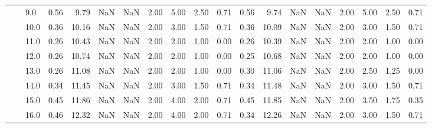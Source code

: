 \begin{tabular}{lllrrrrrrrrrrrrrrrr}
       &     & 9.0  &      0.56 &       9.79 &               NaN &                NaN & 2.00 &   5.00 &             2.50 &                         0.71 &      0.56 &       9.74 &               NaN &                NaN & 2.00 &   5.00 &             2.50 &                         0.71 \\
       &     & 10.0 &      0.36 &      10.16 &               NaN &                NaN & 2.00 &   3.00 &             1.50 &                         0.71 &      0.36 &      10.09 &               NaN &                NaN & 2.00 &   3.00 &             1.50 &                         0.71 \\
       &     & 11.0 &      0.26 &      10.43 &               NaN &                NaN & 2.00 &   2.00 &             1.00 &                         0.00 &      0.26 &      10.39 &               NaN &                NaN & 2.00 &   2.00 &             1.00 &                         0.00 \\
       &     & 12.0 &      0.26 &      10.74 &               NaN &                NaN & 2.00 &   2.00 &             1.00 &                         0.00 &      0.25 &      10.68 &               NaN &                NaN & 2.00 &   2.00 &             1.00 &                         0.00 \\
       &     & 13.0 &      0.26 &      11.08 &               NaN &                NaN & 2.00 &   2.00 &             1.00 &                         0.00 &      0.30 &      11.06 &               NaN &                NaN & 2.00 &   2.50 &             1.25 &                         0.00 \\
       &     & 14.0 &      0.34 &      11.45 &               NaN &                NaN & 2.00 &   3.00 &             1.50 &                         0.71 &      0.34 &      11.48 &               NaN &                NaN & 2.00 &   3.00 &             1.50 &                         0.71 \\
       &     & 15.0 &      0.45 &      11.86 &               NaN &                NaN & 2.00 &   4.00 &             2.00 &                         0.71 &      0.45 &      11.85 &               NaN &                NaN & 2.00 &   3.50 &             1.75 &                         0.35 \\
       &     & 16.0 &      0.46 &      12.32 &               NaN &                NaN & 2.00 &   4.00 &             2.00 &                         0.71 &      0.34 &      12.26 &               NaN &                NaN & 2.00 &   3.00 &             1.50 &                         0.71 \\

\end{tabular}
